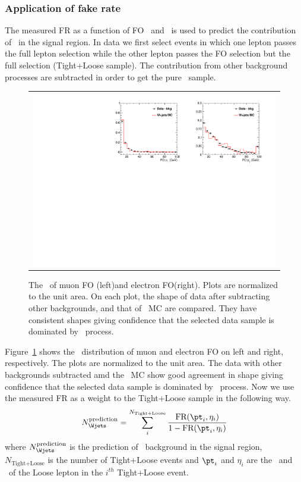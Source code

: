 \subsubsection{Application of fake rate}

The measured FR as a function of FO \pt\ and \Eta\ is used to predict the 
contribution of \Wjets\ in the signal region. In data we first select events 
in which one lepton passes the full lepton selection while the other lepton 
passes the FO selection but the full selection (Tight+Loose sample). 
The contribution from other 
background processes are subtracted in order to get the pure \Wjets\ sample. 
\begin{figure}[htp] 
\centering 
\begin{tabular}{c} 
\includegraphics[width=1.00\textwidth]{figures/FOpT_0j_of.pdf} 
\end{tabular} 
\caption{The \pt\ of muon FO (left)and electron FO(right). 
Plots are normalized to the unit area. 
On each plot, the shape of data after subtracting other backgrounds,
and that of \Wjets\ MC are compared. 
They have consistent shapes giving confidence that the selected data sample 
is dominated by \Wjets\ process. } 
\label{fig:FOpT} 
\end{figure} 
Figure~\ref{fig:FOpT} shows the \pt\ distribution of muon and electron FO
on left and right, respectively. The plots are normalized to the unit area.
The data with other backgrounds subtracted amd the \Wjets\ MC show good
agreement in shape giving confidence that the selected data sample
is dominated by \Wjets\ process. Now we use the measured FR as a weight to the 
Tight+Loose sample in the following way.   
\begin{eqnarray} 
N_{\Wjets}^{\textrm{prediction}} 
= \sum_i^{N_{\textrm{Tight+Loose}}} \frac{\textrm{FR}({\pt}_i, \eta_i)}{1 - \textrm{FR}({\pt}_i, \eta_i)}    
\end{eqnarray} 
where $N_{\Wjets}^{\textrm{prediction}}$ is the prediction of \Wjets\ background 
in the signal region, $N_{\textrm{Tight+Loose}}$ is the number of Tight+Loose events
and ${\pt}_i$ and $\eta_i$ are the \pt\ and \Eta\ of the Loose lepton in the $i^{th}$ 
Tight+Loose event.

